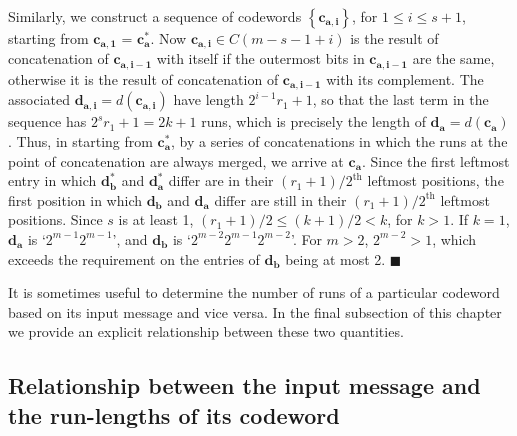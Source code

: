 Similarly, we construct a sequence of codewords
$\left\{\mathbf{c_{a,i}}\right\}$, for $1 \leq i \leq s+1$,
starting from $\mathbf{c_{a,1}}$ = $\mathbf{c_a^{*}}$. Now
$\mathbf{c_{a,i}} \in C(m-s-1+i)$ is the result of concatenation
of $\mathbf{c_{a,i-1}}$ with itself if the outermost bits in
$\mathbf{c_{a,i-1}}$ are the same, otherwise it is  the result of
concatenation of $\mathbf{c_{a,i-1}}$ with its complement. The
associated $\mathbf{d_{a,i}}=d(\mathbf{c_{a,i}})$ have length
$2^{i-1}r_1+1$, so that the last term in the sequence has
$2^sr_1+1=2k+1$ runs, which is precisely the length of
$\mathbf{d_a}=d(\mathbf{c_a})$. Thus, in starting from
$\mathbf{c_a^{*}}$, by a series of concatenations in which the
runs at the point of concatenation are always merged, we arrive at
$\mathbf{c_a}$. Since the first leftmost entry in which
$\mathbf{d_b^{*}}$ and $\mathbf{d_a^{*}}$ differ are in their
$(r_1+1)/2^{\text{th}}$ leftmost positions, the first position in
which $\mathbf{d_b}$ and $\mathbf{d_a}$ differ are still in their
$(r_1+1)/2^{\text{th}}$ leftmost positions. Since $s$ is at least
1, $(r_1+1)/2 \leq (k+1)/2 < k$, for $k>1$. If $k=1$,
$\mathbf{d_a}$ is `$2^{m-1}2^{m-1}$', and $\mathbf{d_b}$ is
`$2^{m-2}2^{m-1}2^{m-2}$'. For $m>2$, $2^{m-2}>1$, which exceeds
the requirement on the entries of $\mathbf{d_b}$ being at most 2.
\hfill$\blacksquare$

It is sometimes useful to determine the number of runs of a
particular codeword based on its input message and vice versa. In
the final subsection of this chapter we provide an explicit
relationship between these two quantities.
\subsection{Relationship between the input message and the run-lengths of its
codeword}\label{sectionRM23}

